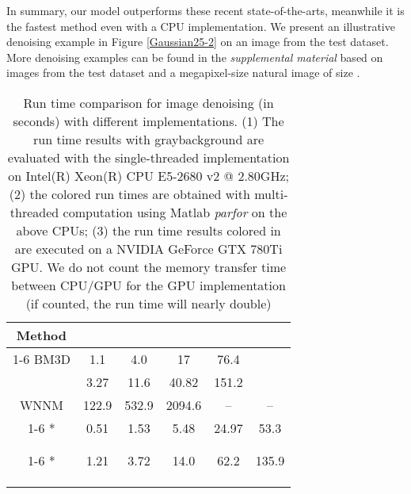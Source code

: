 \documentclass[10pt,journal,compsoc]{IEEEtran}
\begin{document}
\begin{comment}
We show the run time and restoration performance of the above algorithms based on 68 test images 
for the noise level  in Figure \ref{fig:speed}. 
\end{comment}

In summary, our  model outperforms these recent state-of-the-arts, 
meanwhile it is the fastest method even with a CPU implementation. 
We present an illustrative denoising example in Figure \ref{Gaussian25-2} on an image from the test dataset. 
More denoising examples can be found in the \textit{supplemental material} based on images from the test dataset 
and a megapixel-size natural image of size . 
\begin{table}[t!]
\centering
\hspace*{-0.2cm} \begin{tabular}{c c c c c c}
\Xhline{0.5pt}
\cline{1-6}
Method &  &  &  &  & \\
\cline{1-6}
\rowcolor[gray]{0.85} BM3D \cite{BM3D} &1.1 &4.0 &17 & 76.4 & {\color{black}{176.0}}\\
\rowcolor[gray]{0.85}  \cite{CSF2014} &3.27 &11.6 &40.82 & 151.2 & {\color{black}{494.8}}\\
\rowcolor[gray]{0.85} WNNM \cite{WNNM} &122.9 & 532.9 &2094.6 & -- & --\\
\cline{1-6}
\multirow{3}*{} & \cellcolor[gray]{0.85} 0.51 & 
\cellcolor[gray]{0.85} 1.53 & \cellcolor[gray]{0.85} 5.48 
&\cellcolor[gray]{0.85} 24.97 & \cellcolor[gray]{0.85} 53.3\\
& {\color{blue}{0.43}}& {\color{blue}{0.78}}& {\color{blue}{2.25}}& {\color{blue}{8.01}}& {\color{blue}{21.6}}\\
& {\color{red}{0.005}} & {\color{red}{0.015}} & {\color{red}{0.054}} &{\color{red}{0.18}} & {\color{red}{0.39}}\\
\cline{1-6}
\multirow{3}*{} & \cellcolor[gray]{0.85} 1.21 & 
\cellcolor[gray]{0.85} 3.72 & \cellcolor[gray]{0.85} 14.0 
&\cellcolor[gray]{0.85} 62.2& \cellcolor[gray]{0.85} 135.9\\
& {\color{blue}{0.56}}& {\color{blue}{1.17}}& {\color{blue}{3.64}}& {\color{blue}{13.01}}& {\color{blue}{30.1}}\\
& {\color{red}{0.01}} & {\color{red}{0.032}} &{\color{red}{0.116}} & {\color{red}{0.40}} & {\color{red}{0.87}}\\
\Xhline{0.5pt}
\cline{1-6}
\end{tabular}
\vspace*{0.2cm}
\caption{Run time comparison for image denoising (in seconds) with different implementations. 
(1) The run time results with \colorbox{grayB}{gray}background are evaluated 
with the single-threaded implementation on Intel(R) Xeon(R) CPU E5-2680 v2 @ 2.80GHz; 
(2) the {\color{blue}{blue}} colored run times are obtained with multi-threaded computation using Matlab \textit{parfor} 
on the above CPUs;
(3) the run time results colored in {\color{red}{red}} are executed on a NVIDIA GeForce GTX 780Ti GPU. 
We do not count the memory transfer time between CPU/GPU for the GPU implementation (if counted, the run time will nearly 
double)}\label{run time}
\vspace*{-1cm}\end{table}
\end{document}

